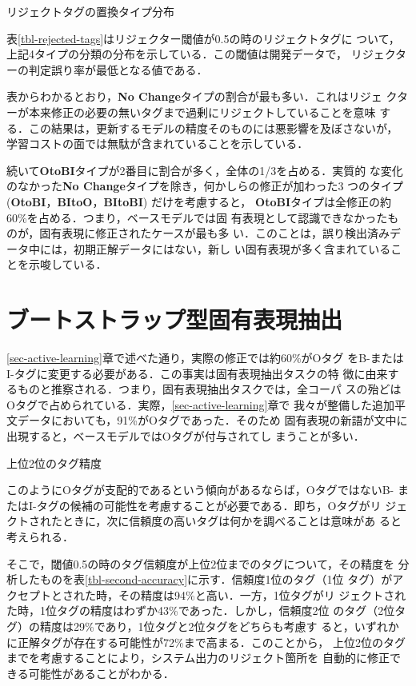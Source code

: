 \documentclass[japanese]{jnlp_1.4}
\begin{document}
\begin{table}[b]
\caption{リジェクトタグの置換タイプ分布}
\label{tbl-rejected-tags}

\end{table}


表\ref{tbl-rejected-tags}はリジェクター閾値が0.5の時のリジェクトタグに
ついて，上記4タイプの分類の分布を示している．この閾値は開発データで，
リジェクターの判定誤り率が最低となる値である．

表からわかるとおり，{\bf No Change}タイプの割合が最も多い．これはリジェ
クターが本来修正の必要の無いタグまで過剰にリジェクトしていることを意味
する．この結果は，更新するモデルの精度そのものには悪影響を及ぼさないが，
学習コストの面では無駄が含まれていることを示している．

続いて{\bf OtoBI}タイプが2番目に割合が多く，全体の1/3を占める．実質的
な変化のなかった{\bf No Change}タイプを除き，何かしらの修正が加わった3
つのタイプ ({\bf OtoBI}，{\bf BItoO}，{\bf BItoBI}) だけを考慮すると，
{\bf OtoBI}タイプは全修正の約60\%を占める．つまり，ベースモデルでは固
有表現として認識できなかったものが，固有表現に修正されたケースが最も多
い．このことは，誤り検出済みデータ中には，初期正解データにはない，新し
い固有表現が多く含まれていることを示唆している．


\section{ブートストラップ型固有表現抽出}
\label{sec-bootstrapping}

\ref{sec-active-learning}章で述べた通り，実際の修正では約60\%がOタグ
をB-またはI-タグに変更する必要がある．この事実は固有表現抽出タスクの特
徴に由来するものと推察される．つまり，固有表現抽出タスクでは，全コーパ
スの殆どはOタグで占められている．実際，\ref{sec-active-learning}章で
我々が整備した追加平文データにおいても，91\%がOタグであった．そのため
固有表現の新語が文中に出現すると，ベースモデルではOタグが付与されてし
まうことが多い．

\begin{table}[b]
\caption{上位2位のタグ精度}
\label{tbl-second-accuracy}

\end{table}


このようにOタグが支配的であるという傾向があるならば，OタグではないB-
またはI-タグの候補の可能性を考慮することが必要である．即ち，Oタグがリ
ジェクトされたときに，次に信頼度の高いタグは何かを調べることは意味があ
ると考えられる．

そこで，閾値0.5の時のタグ信頼度が上位2位までのタグについて，その精度を
分析したものを表\ref{tbl-second-accuracy}に示す．信頼度1位のタグ（1位
タグ）がアクセプトとされた時，その精度は94\%と高い．一方，1位タグがリ
ジェクトされた時，1位タグの精度はわずか43\%であった．しかし，信頼度2位
のタグ（2位タグ）の精度は29\%であり，1位タグと2位タグをどちらも考慮す
ると，いずれかに正解タグが存在する可能性が72\%まで高まる．このことから，
上位2位のタグまでを考慮することにより，システム出力のリジェクト箇所を
自動的に修正できる可能性があることがわかる．
\end{document}
